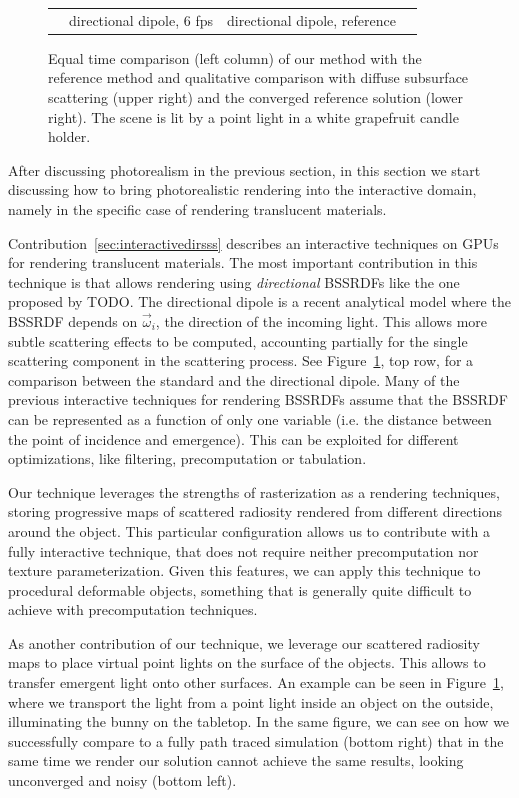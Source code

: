 \begin{figure}
\begin{tabular}{@{}c@{$\,$}c@{}c@{}c@{}}
& directional dipole, 6 fps & directional dipole, reference \\[-1ex]
\end{tabular}
\caption{Equal time comparison (left column) of our method with the reference method and qualitative comparison with diffuse subsurface scattering (upper right) and the converged reference solution (lower right). The scene is lit by a point light in a white grapefruit candle holder.} %
\label{fig:optixcomparison}
\end{figure}

After discussing photorealism in the previous section, in this section we start discussing how to bring photorealistic rendering into the interactive domain, namely in the specific case of rendering translucent materials. 

Contribution~\ref{sec:interactivedirsss} describes an interactive techniques on GPUs for rendering translucent materials. The most important contribution in this technique is that allows rendering using \emph{directional} BSSRDFs like the one proposed by TODO. The directional dipole is a recent analytical model where the BSSRDF depends on $\vec{\omega}_i$, the direction of the incoming light. This allows more subtle scattering effects to be computed, accounting partially for the single scattering component in the scattering process. See Figure~\ref{fig:optixcomparison}, top row, for a comparison between the standard and the directional dipole. Many of the previous interactive techniques for rendering BSSRDFs assume that the BSSRDF can be represented as a function of only one variable (i.e. the distance between the point of incidence and emergence). This can be exploited for different optimizations, like filtering, precomputation or tabulation. 

Our technique leverages the strengths of rasterization as a rendering techniques, storing progressive maps of scattered radiosity rendered from different directions around the object. This particular configuration allows us to contribute with a fully interactive technique, that does not require neither precomputation nor texture parameterization. Given this features, we can apply this technique to procedural deformable objects, something that is generally quite difficult to achieve with precomputation techniques.

As another contribution of our technique, we leverage our scattered radiosity maps to place virtual point lights on the surface of the objects. This allows to transfer emergent light onto other surfaces. An example can be seen in Figure~\ref{fig:optixcomparison}, where we transport the light from a point light inside an object on the outside, illuminating the bunny on the tabletop. In the same figure, we can see on how we successfully compare to a fully path traced simulation (bottom right) that in the same time we render our solution cannot achieve the same results, looking unconverged and noisy (bottom left).

